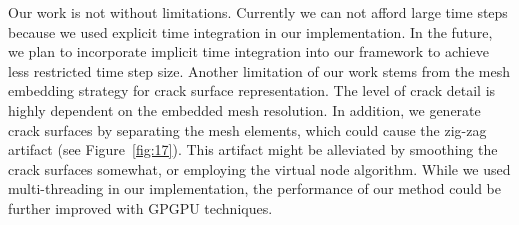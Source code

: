 Our work is not without limitations. Currently we can not afford large time steps because we used explicit time integration in our implementation. In the future, we plan to incorporate implicit time integration into our framework to achieve less restricted time step size. Another limitation of our work stems from the mesh embedding strategy for crack surface representation. The level of crack detail is highly dependent on the embedded mesh resolution. In addition, we generate crack surfaces by separating the mesh elements, which could cause the zig-zag artifact (see Figure~\ref{fig:17}). This artifact might be alleviated by smoothing the crack surfaces somewhat, or employing the virtual node algorithm. While we used multi-threading in our implementation, the performance of our method could be further improved with GPGPU techniques.

